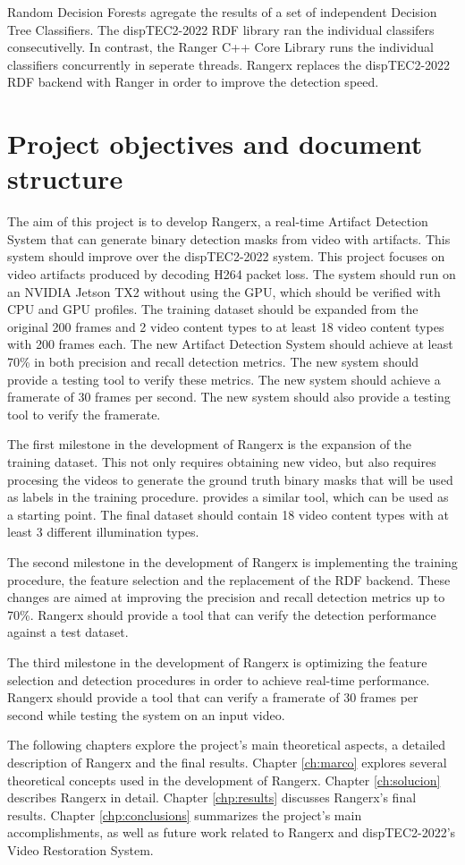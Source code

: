 Random Decision Forests agregate the results of a set of independent Decision Tree Classifiers. The dispTEC2-2022 RDF library ran the individual classifers consecutivelly. In contrast, the Ranger C++ Core Library runs the individual classifiers concurrently in seperate threads. Rangerx replaces the dispTEC2-2022 RDF backend with Ranger in order to improve the detection speed.

\section{Project objectives and document structure}
\label{sec:intro_objectives}

The aim of this project is to develop Rangerx, a real-time Artifact Detection System that can generate binary detection masks from video with artifacts. This system should improve over the dispTEC2-2022 system. This project focuses on video artifacts produced by decoding H264 packet loss. The system should run on an NVIDIA Jetson TX2 without using the GPU, which should be verified with CPU and GPU profiles. The training dataset should be expanded from the original 200 frames and 2 video content types to at least 18 video content types with 200 frames each. The new Artifact Detection System should achieve at least 70\% in both precision and recall detection metrics. The new system should provide a testing tool to verify these metrics. The new system should achieve a framerate of 30 frames per second. The new system should also provide a testing tool to verify the framerate.

The first milestone in the development of Rangerx is the expansion of the training dataset. This not only requires obtaining new video, but also requires procesing the videos to generate the ground truth binary masks that will be used as labels in the training procedure. \cite{Brenes2022} provides a similar tool, which can be used as a starting point. The final dataset should contain 18 video content types with at least 3 different illumination types.

The second milestone in the development of Rangerx is implementing the training procedure, the feature selection and the replacement of the RDF backend. These changes are aimed at improving the precision and recall detection metrics up to 70\%. Rangerx should provide a tool that can verify the detection performance against a test dataset.

The third milestone in the development of Rangerx is optimizing the feature selection and detection procedures in order to achieve real-time performance. Rangerx should provide a tool that can verify a framerate of 30 frames per second while testing the system on an input video.

The following chapters explore the project's main theoretical aspects, a detailed description of Rangerx and the final results. Chapter \ref{ch:marco} explores several theoretical concepts used in the development of Rangerx. Chapter \ref{ch:solucion} describes Rangerx in detail. Chapter \ref{chp:results} discusses Rangerx's final results. Chapter \ref{chp:conclusions} summarizes the project's main accomplishments, as well as future work related to Rangerx and dispTEC2-2022's Video Restoration System.
